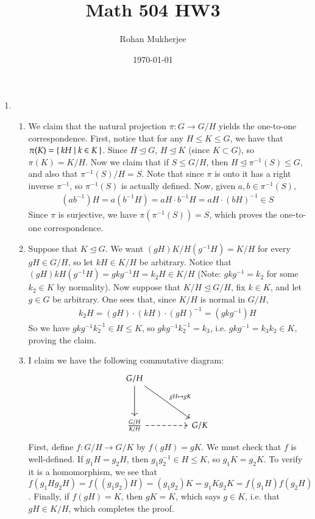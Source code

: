 \documentclass[12pt]{article}
\title{Math 504 HW3}
\date{\today}
\author{Rohan Mukherjee}
\theoremstyle{definitionstyle}
\newcommand{\nsg}{\trianglelefteq}
\begin{document}
	\maketitle
	\begin{enumerate}[leftmargin=\labelsep]
		\item \begin{enumerate}
			\item We claim that the natural projection $\pi: G \to G/H$ yields the one-to-one correspondence. First, notice that for any $H \leq K \leq G$, we have that $\pi(K) = \Set{kH | k \in K}$. Since $H \nsg G$, $H \nsg K$ (since $K \subset G$), so $\pi(K) = K / H$. Now we claim that if $S \leq G/H$, then $H \nsg \pi^{-1}(S) \leq G$, and also that $\pi^{-1}(S) / H = S$. Note that since $\pi$ is onto it has a right inverse $\pi^{-1}$, so $\pi^{-1}(S)$ is actually defined. Now, given $a, b \in \pi^{-1}(S)$,
			\begin{align*}
				(ab^{-1})H = a(b^{-1}H) = aH \cdot b^{-1}H = aH \cdot (bH)^{-1} \in S
			\end{align*}
			Since $\pi$ is surjective, we have $\pi(\pi^{-1}(S)) = S$, which proves the one-to-one correspondence.
			
			\item Suppose that $K \nsg G$. We want $(gH) K/H (g^{-1}H) = K/H$ for every $gH \in G/H$, so let $kH \in K/H$ be arbitrary. Notice that $(gH) kH (g^{-1}H) = gkg^{-1}H = k_2H \in K/H$ (Note: $gkg^{-1} = k_2$ for some $k_2 \in K$ by normality). Now suppose that $K/H \nsg G/H$, fix $k \in K$, and let $g \in G$ be arbitrary. One sees that, since $K/H$ is normal in $G/H$,
			\begin{align*}
				k_2H = (gH) \cdot (kH) \cdot (gH)^{-1} = (gkg^{-1})H
			\end{align*}
			So we have $gkg^{-1}k_2^{-1} \in H \leq K$, so $gkg^{-1}k_2^{-1} = k_3$, i.e. $gkg^{-1} = k_3k_2 \in K$, proving the claim.
			
			\item I claim we have the following commutative diagram:
			\[\begin{tikzcd}
				{G/H} \\
				\\
				{\frac{G/H}{K/H}} && {G/K}
				\arrow["{gH \mapsto gK}", from=1-1, to=3-3]
				\arrow[from=1-1, to=3-1]
				\arrow[dashed, from=3-1, to=3-3]
			\end{tikzcd}\]
			First, define $f: G/H \to G/K$ by $f(gH) = gK$. We must check that $f$ is well-defined. If $g_1H = g_2H$, then $g_1g_2^{-1} \in H \leq K$, so $g_1K = g_2K$. To verify it is a homomorphism, we see that $f(g_1Hg_2H) = f((g_1g_2)H) = (g_1g_2)K = g_1K g_2K = f(g_1H)f(g_2H)$. Finally, if $f(gH) = K$, then $gK = K$, which says $g \in K$, i.e. that $gH \in K/H$, which completes the proof.
		\end{enumerate}
		

\end{enumerate}
\end{document}
